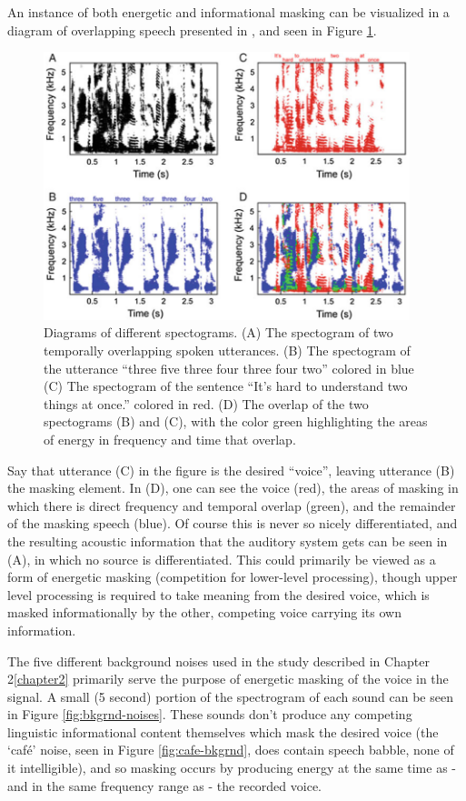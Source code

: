 \documentclass[dissertation,copyright]{uathesis}
\begin{document}
An instance of both energetic and informational masking can be visualized in a diagram of overlapping speech presented in \cite{middlebrooks:17}, and seen in Figure \ref{fig:sos-masked-spctgrms}.
%
\begin{figure}
\centering
  \includegraphics[width=0.95\textwidth]{figure/speech-on-speech_masked_spectrograms.png}
  \caption{Diagrams of different spectograms. (A) The spectogram of two temporally overlapping spoken utterances. (B) The spectogram of the utterance ``three five three four three four two'' colored in blue (C) The spectogram of the sentence ``It's hard to understand two things at once.'' colored in red. (D) The overlap of the two spectograms (B) and (C), with the color green highlighting the areas of energy in frequency and time that overlap. }
  \label{fig:sos-masked-spctgrms}
\end{figure}
%
Say that utterance (C) in the figure is the desired ``voice'', leaving utterance (B) the masking element.  In (D), one can see the voice (red), the areas of masking in which there is direct frequency and temporal overlap (green), and the remainder of the masking speech (blue). Of course this is never so nicely differentiated, and the resulting acoustic information that the auditory system gets can be seen in (A), in which no source is differentiated.  This could primarily be viewed as a form of energetic masking (competition for lower-level processing), though upper level processing is required to take meaning from the desired voice, which is masked informationally by the other, competing voice carrying its own information.

The five different background noises used in the study described in Chapter 2\ref{chapter2} primarily serve the purpose of energetic masking of the voice in the signal.  A small (5 second) portion of the spectrogram of each sound can be seen in Figure \ref{fig:bkgrnd-noises}.  These sounds don't produce any competing linguistic informational content themselves which mask the desired voice (the `caf\'{e}' noise, seen in Figure \ref{fig:cafe-bkgrnd}, does contain speech babble, none of it intelligible), and so masking occurs by producing energy at the same time as - and in the same frequency range as - the recorded voice.
\end{document}
